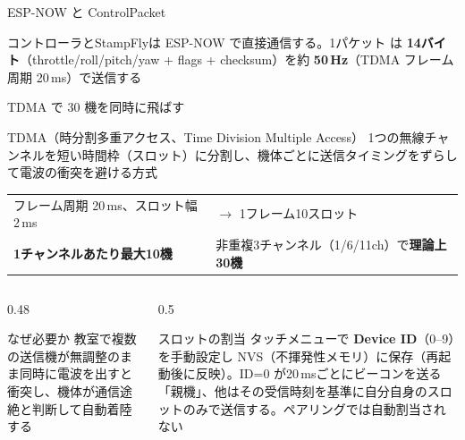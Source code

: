 \begin{frame}{ESP-NOW と ControlPacket}
  \begin{center}
  \end{center}

  \vspace{0.3em}

  {\small コントローラとStampFlyは ESP-NOW で直接通信する。1パケット  は \textbf{14バイト}（throttle/roll/pitch/yaw + flags + checksum）を約 \textbf{50\,Hz}（TDMA フレーム周期 20\,ms）で送信する}
\end{frame}

\begin{frame}{TDMA で 30 機を同時に飛ばす}
  \begin{block}{TDMA（時分割多重アクセス、Time Division Multiple Access）}
    \footnotesize 1つの無線チャンネルを短い時間枠（スロット）に分割し、機体ごとに送信タイミングをずらして電波の衝突を避ける方式
  \end{block}

  \vspace{0.2em}

  \begin{table}
    \centering\footnotesize
    \begin{tabular}{ll}
      \hline
      フレーム周期 20\,ms、スロット幅 2\,ms & $\to$ 1フレーム10スロット \\
      \textbf{1チャンネルあたり最大10機} & 非重複3チャンネル（1/6/11ch）で\textbf{理論上30機} \\
      \hline
    \end{tabular}
  \end{table}

  \vspace{0.1em}

  \begin{columns}[T]
    \begin{column}{0.48\textwidth}
      \begin{alertblock}{なぜ必要か}
        \scriptsize 教室で複数の送信機が無調整のまま同時に電波を出すと衝突し、機体が通信途絶と判断して自動着陸する
      \end{alertblock}
    \end{column}
    \begin{column}{0.5\textwidth}
      \begin{exampleblock}{スロットの割当}
        \scriptsize タッチメニューで \textbf{Device ID}（0--9）を手動設定し NVS（不揮発性メモリ）に保存（再起動後に反映）。ID=0 が20\,msごとにビーコンを送る「親機」、他はその受信時刻を基準に自分自身のスロットのみで送信する。ペアリングでは自動割当されない
      \end{exampleblock}
    \end{column}
  \end{columns}

\end{frame}

